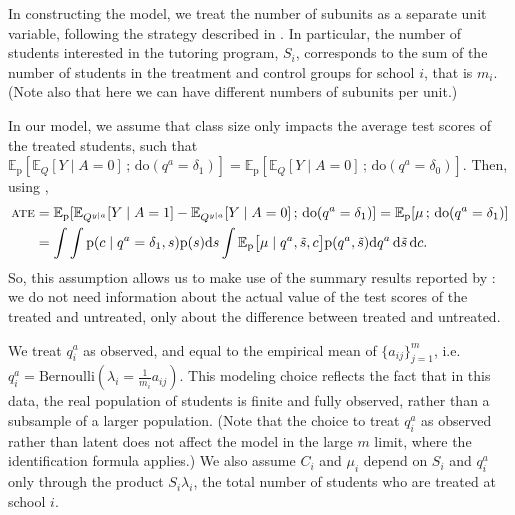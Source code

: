 \documentclass[12pt]{article}
\newcommand{\rmdo}{\mathrm{do}}
\newcommand{\s}{\, ; \,}
\newcommand{\di}{\mathrm{d}}
\newcommand{\pr}{\mathrm{p}}
\begin{document}
In constructing the model, we treat the number of subunits as a separate unit variable, following the strategy described in . 
In particular, the number of students interested in the tutoring program, $S_i$, corresponds to the sum of the number of students in the treatment and control groups for school $i$, that is $m_i$. (Note also that here we can have different numbers of subunits per unit.)

In our model, we assume that class size only impacts the average test scores of the treated students, such that $\mathbb{E}_\pr[\mathbb{E}_Q[Y \mid A=0] \s \rmdo(q^{a} = \delta_1)] = \mathbb{E}_\pr[\mathbb{E}_Q[Y \mid A=0] \s \rmdo(q^{a} = \delta_0)]$.
Then, using ,
\begin{equation} \label{eqn:eight_schools_interfere_simplified_ate}
\begin{split}
	\textsc{ate} &= \mathbb{E}_\pr[\mathbb{E}_{Q^{y|a}}[Y \mid A = 1] - \mathbb{E}_{Q^{y|a}}[Y \mid A = 0] \s \rmdo(q^{a} = \delta_1)]
	 = \mathbb{E}_\pr[\mu \s \rmdo(q^{a} = \delta_1)]\\
	& = \int \int \pr(c \mid q^{a} = \delta_1, s) \pr(s) \di s \int \mathbb{E}_\pr\big[\mu \mid {q}^{a}, \tilde{s}, c\big] \pr({q}^{a}, \tilde{s}) \di {q}^{a}\, \di\tilde{s}\, \di c.
\end{split}
\end{equation}
So, this assumption allows us to make use of the summary results reported by \citet{Alderman1979-on}: we do not need information about the actual value of the test scores of the treated and untreated, only about the difference between treated and untreated.

We treat $q^a_i$ as observed, and equal to the empirical mean of $\{a_{ij}\}_{j=1}^m$, i.e. $q^a_i = \mathrm{Bernoulli}(\lambda_i = \frac{1}{m_i} a_{ij})$.
This modeling choice reflects the fact that in this data, the real population of students is finite and fully observed, rather than a subsample of a larger population.
(Note that the choice to treat $q^a_i$ as observed rather than latent does not affect the model in the large $m$ limit, where the identification formula applies.)
We also assume $C_i$ and $\mu_i$ depend on $S_i$ and $q^{a}_i$ only through the product $S_i \lambda_i$, the total number of students who are treated at school $i$.
\end{document}
